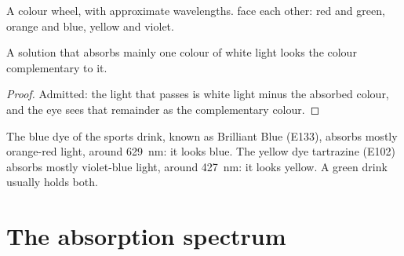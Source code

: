 \begin{omfigure}

{\small A colour wheel, with approximate wavelengths.  face each other: red and green, orange and blue, yellow and
violet.}
\end{omfigure}

\begin{proposition}\label{prop:g11:absorbance:colour-seen}
A solution that absorbs mainly one colour of white light looks the
colour complementary to it.
\end{proposition}

\begin{proof}
Admitted: the light that passes is white light minus the absorbed
colour, and the eye sees that remainder as the complementary colour.
\end{proof}

\begin{example}\label{ex:g11:absorbance:dyes}
The blue dye of the sports drink, known as Brilliant Blue (E133),
absorbs mostly orange-red light, around \qty{629}{nm}: it looks blue. The
yellow dye tartrazine (E102) absorbs mostly violet-blue light, around
\qty{427}{nm}: it looks yellow. A green drink usually holds both.
\end{example}

\section{The absorption spectrum}


